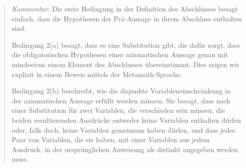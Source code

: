 {\footnotesize\begin{quotation}
{\em Kommentar:} Die erste Bedingung in der Definition des Abschlusses besagt einfach, dass die Hypothesen der Prä-Aussage in ihrem Abschluss enthalten sind.

Bedingung 2(a) besagt, dass es eine Substitution gibt, die dafür sorgt, dass die obligatorischen Hypothesen einer axiomatischen Aussage genau mit mindestens einem Element des Abschlusses übereinstimmt.  Dies zeigen wir explizit in einem Beweis mittels der Metamath-Sprache.

%

Bedingung 2(b) beschreibt, wie die disjunkte Variableneinschränkung in der axiomatischen Aussage erfüllt werden müssen.  Sie besagt, dass nach einer Substitution für zwei Variablen, die verschieden sein müssen, die beiden resultierenden Ausdrücke entweder keine Variablen enthalten dürfen oder, falls doch, keine Variablen gemeinsam haben dürfen, und dass jedes Paar von Variablen, die sie haben, mit einer Variablen aus jedem Ausdruck, in der ursprünglichen Anweisung als distinkt angegeben werden muss.
\end{quotation}}

